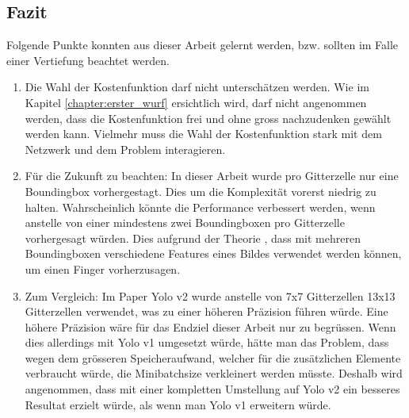 \subsection{Fazit}
Folgende Punkte konnten aus dieser Arbeit gelernt werden, bzw. sollten im Falle einer Vertiefung beachtet werden. 
\begin{enumerate}
\item Die Wahl der Kostenfunktion darf nicht unterschätzen werden. 
Wie im Kapitel \ref{chapter:erster_wurf} ersichtlich wird, darf nicht angenommen werden, dass die Kostenfunktion frei und ohne gross nachzudenken gewählt werden kann. 
Vielmehr muss die Wahl der Kostenfunktion stark mit dem Netzwerk und dem Problem interagieren. 

\item Für die Zukunft zu beachten: In dieser Arbeit wurde pro Gitterzelle nur eine Boundingbox vorhergestagt.
Dies um die Komplexität vorerst niedrig zu halten. 
Wahrscheinlich könnte die Performance verbessert werden, wenn anstelle von einer mindestens zwei Boundingboxen pro Gitterzelle vorhergesagt würden. Dies aufgrund der Theorie \cite{PrivateCommunication}, dass mit mehreren Boundingboxen verschiedene Features eines Bildes verwendet werden können, um einen Finger vorherzusagen.

\item Zum Vergleich: Im Paper Yolo v2 wurde anstelle von 7x7 Gitterzellen 13x13 Gitterzellen verwendet, was zu einer höheren Präzision führen würde. 
Eine höhere Präzision wäre für das Endziel dieser Arbeit nur zu begrüssen. 
Wenn dies allerdings mit Yolo v1 umgesetzt würde, hätte man das Problem, dass wegen dem grösseren Speicheraufwand, welcher für die zusätzlichen Elemente \grqq{}verbraucht\grqq{} würde, die Minibatchsize verkleinert werden müsste. 
Deshalb wird angenommen, dass mit einer kompletten Umstellung auf Yolo v2 ein besseres Resultat erzielt würde, als wenn man Yolo v1 erweitern würde.
\end{enumerate}
